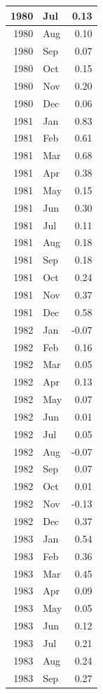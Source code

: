 \documentclass[
]{article}
\begin{document}
\begin{table}[H]
\begin{tabular}[t]{r|l|r}
\hline
1980 & Jul & 0.13\\
\hline
1980 & Aug & 0.10\\
\hline
1980 & Sep & 0.07\\
\hline
1980 & Oct & 0.15\\
\hline
1980 & Nov & 0.20\\
\hline
1980 & Dec & 0.06\\
\hline
1981 & Jan & 0.83\\
\hline
1981 & Feb & 0.61\\
\hline
1981 & Mar & 0.68\\
\hline
1981 & Apr & 0.38\\
\hline
1981 & May & 0.15\\
\hline
1981 & Jun & 0.30\\
\hline
1981 & Jul & 0.11\\
\hline
1981 & Aug & 0.18\\
\hline
1981 & Sep & 0.18\\
\hline
1981 & Oct & 0.24\\
\hline
1981 & Nov & 0.37\\
\hline
1981 & Dec & 0.58\\
\hline
1982 & Jan & -0.07\\
\hline
1982 & Feb & 0.16\\
\hline
1982 & Mar & 0.05\\
\hline
1982 & Apr & 0.13\\
\hline
1982 & May & 0.07\\
\hline
1982 & Jun & 0.01\\
\hline
1982 & Jul & 0.05\\
\hline
1982 & Aug & -0.07\\
\hline
1982 & Sep & 0.07\\
\hline
1982 & Oct & 0.01\\
\hline
1982 & Nov & -0.13\\
\hline
1982 & Dec & 0.37\\
\hline
1983 & Jan & 0.54\\
\hline
1983 & Feb & 0.36\\
\hline
1983 & Mar & 0.45\\
\hline
1983 & Apr & 0.09\\
\hline
1983 & May & 0.05\\
\hline
1983 & Jun & 0.12\\
\hline
1983 & Jul & 0.21\\
\hline
1983 & Aug & 0.24\\
\hline
1983 & Sep & 0.27\\

\end{tabular}
\end{table}
\end{document}
